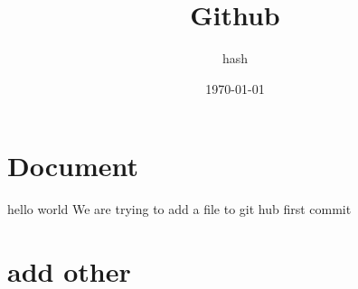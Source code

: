 \documentclass{report}
\title{Github}
\author{hash}
\date{\today}
\begin{document}
\maketitle
\section{Document}

hello world
We are trying to add a file to git hub
first commit

\section{add other}
\end{document}
